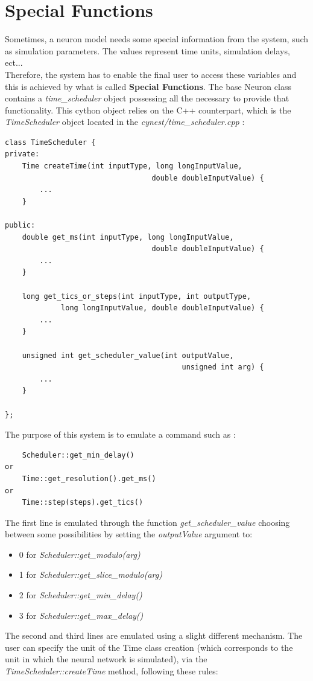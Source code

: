 \documentclass{article}
\begin{document}
\section{Special Functions}
Sometimes, a neuron model needs some special information from the system, such as simulation parameters. The values represent time units, simulation delays, ect...\\
Therefore, the system has to enable the final user to access these variables and this is achieved by what is called \textbf{Special Functions}. The base Neuron class contains a \emph{time\_scheduler} object possessing all the necessary to provide that functionality. This cython object relies on the C++ counterpart, which is the \emph{TimeScheduler} object located in the \emph{cynest/time\_scheduler.cpp} :
\begin{verbatim}
class TimeScheduler {
private:
    Time createTime(int inputType, long longInputValue, 
                                  double doubleInputValue) {
        ...
    }

public:
    double get_ms(int inputType, long longInputValue, 
                                  double doubleInputValue) {
        ...
    }

    long get_tics_or_steps(int inputType, int outputType, 
             long longInputValue, double doubleInputValue) {
        ...
    }

    unsigned int get_scheduler_value(int outputValue, 
                                         unsigned int arg) {
        ...
    }

};
\end{verbatim}
The purpose of this system is to emulate a command such as :
\begin{verbatim}
    Scheduler::get_min_delay()
or
    Time::get_resolution().get_ms()
or
    Time::step(steps).get_tics()
\end{verbatim}
The first line is emulated through the function \emph{get\_scheduler\_value} choosing between some possibilities by setting the \emph{outputValue} argument to:
\begin{itemize}
\item 0 for \emph{Scheduler::get\_modulo(arg)}
\item 1 for \emph{Scheduler::get\_slice\_modulo(arg)}
\item 2 for \emph{Scheduler::get\_min\_delay()}
\item 3 for \emph{Scheduler::get\_max\_delay()}
\end{itemize}
The second and third lines are emulated using a slight different mechanism. The user can specify the unit of the Time class creation (which corresponds to the unit in which the neural network is simulated), via the \emph{TimeScheduler::createTime} method, following these rules:
\end{document}
